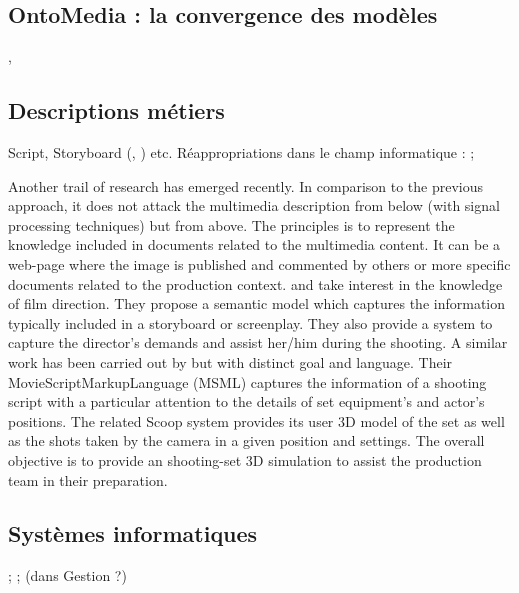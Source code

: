 \subsection{OntoMedia : la convergence des modèles}
\cite{Lee2012a}, \cite{Burger2011}



\subsection{Descriptions métiers}
Script, Storyboard (\cite{Martin2005}, \cite{ThiBui2003}) etc.
Réappropriations dans le champ informatique : \cite{Chakravarthy2009b} ; \cite{Chakravarthy2009c}

Another trail of research has emerged recently. In comparison to the previous approach, it does not attack the multimedia description from below (with signal processing techniques) but from above. The principles is to represent the knowledge included in documents related to the multimedia content. It can be a web-page where the image is published and commented by others \cite{Simperl2009} or more specific documents related to the production context. \cite{Chakravarthy2009b} and \cite{Chakravarthy2009c} take interest in the knowledge of film direction. They propose a semantic model which captures the information typically included in a storyboard or screenplay. They also provide a system to capture the director's demands and assist her/him during the shooting. 
A similar work has been carried out by \cite{VanRijsselbergen2009} but with distinct goal and language. Their MovieScriptMarkupLanguage (MSML) captures the information of a shooting script with a particular attention to the details of set equipment's and actor's positions. The related Scoop system \cite{Cardinaels2008} provides its user 3D model of the set as well as the shots taken by the camera in a given position and settings. The overall objective is to provide an shooting-set 3D simulation to assist the production team in their preparation.\\






\subsection{Systèmes informatiques}
\cite{Tsinaraki2005} ; \cite{Tsinaraki2004} ; \cite{Dasiopoulou2009} (dans Gestion ?)




